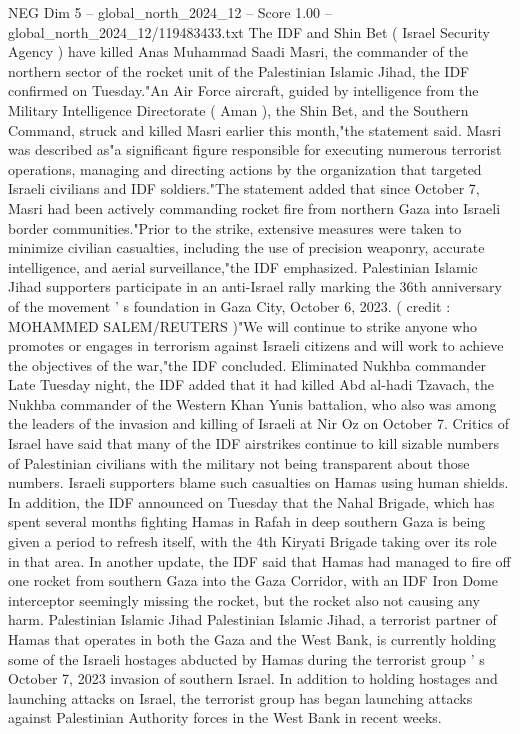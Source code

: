 \begin{textsample}{NEG Dim 5 – global\_north\_2024\_12 – Score 1.00 – global\_north\_2024\_12/119483433.txt}  \label{ex:f5_neg_359}
The IDF and Shin Bet ( Israel Security Agency ) have killed Anas Muhammad Saadi Masri, the commander of the northern sector of the rocket unit of the Palestinian Islamic Jihad, the IDF confirmed on Tuesday."An Air Force aircraft, guided by intelligence from the Military Intelligence Directorate ( Aman ), the Shin Bet, and the Southern Command, struck and killed Masri earlier this month,"the statement said.
Masri was described as"a significant figure responsible for executing numerous terrorist operations, managing and directing actions by the organization that targeted Israeli civilians and IDF soldiers."The statement added that since October 7, Masri had been actively commanding rocket fire from northern Gaza into Israeli border communities."Prior to the strike, extensive measures were taken to minimize civilian casualties, including the use of precision weaponry, accurate intelligence, and aerial surveillance,"the IDF emphasized.
Palestinian Islamic Jihad supporters participate in an anti-Israel rally marking the 36th anniversary of the movement ' s foundation in Gaza City, October 6, 2023. ( credit : MOHAMMED SALEM/REUTERS )"We will continue to strike anyone who promotes or engages in terrorism against Israeli citizens and will work to achieve the objectives of the war,"the IDF concluded.
Eliminated Nukhba commander Late Tuesday night, the IDF added that it had killed Abd al-hadi Tzavach, the Nukhba commander of the Western Khan Yunis battalion, who also was among the leaders of the invasion and killing of Israeli at Nir Oz on October 7.
Critics of Israel have said that many of the IDF airstrikes continue to kill sizable numbers of Palestinian civilians with the military not being transparent about those numbers.
Israeli supporters blame such casualties on Hamas using human shields.
In addition, the IDF announced on Tuesday that the Nahal Brigade, which has spent several months fighting Hamas in Rafah in deep southern Gaza is being given a period to refresh itself, with the 4th Kiryati Brigade taking over its role in that area.
In another update, the IDF said that Hamas had managed to fire off one rocket from southern Gaza into the Gaza Corridor, with an IDF Iron Dome interceptor seemingly missing the rocket, but the rocket also not causing any harm.
Palestinian Islamic Jihad Palestinian Islamic Jihad, a terrorist partner of Hamas that operates in both the Gaza and the West Bank, is currently holding some of the Israeli hostages abducted by Hamas during the terrorist group ' s October 7, 2023 invasion of southern Israel.
In addition to holding hostages and launching attacks on Israel, the terrorist group has began launching attacks against Palestinian Authority forces in the West Bank in recent weeks.

\end{textsample}
